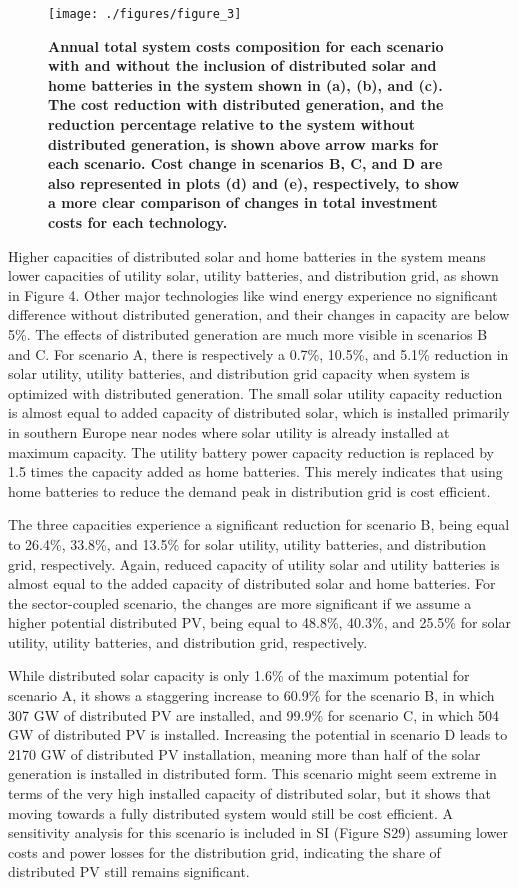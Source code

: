 \documentclass[review]{elsarticle}
\begin{document}
\begin{figure}
   \texttt{[image: ./figures/figure\_3]}
   \caption{\textbf{Annual total system costs composition for each scenario with and without the inclusion of distributed solar and home batteries in the system shown in (a), (b), and (c). The cost reduction with distributed generation, and the reduction percentage relative to the system without distributed generation, is shown above arrow marks for each scenario. Cost change in scenarios B, C, and D  are also represented in plots (d) and (e), respectively, to show a more clear comparison of changes in total investment costs for each technology.}}
   \label{fig:costs}
\end{figure}

Higher capacities of distributed solar and home batteries in the system means lower capacities of utility solar, utility batteries, and distribution grid, as shown in Figure 4. Other major technologies like wind energy experience no significant difference without distributed generation, and their changes in capacity are below 5\%. The effects of distributed generation are much more visible in scenarios B and C. For scenario A, there is respectively a 0.7\%, 10.5\%, and 5.1\% reduction in solar utility, utility batteries, and distribution grid capacity when system is optimized with distributed generation. The small solar utility capacity reduction is almost equal to added capacity of distributed solar, which is installed primarily in southern Europe near nodes where solar utility is already installed at maximum capacity. The utility battery power capacity reduction is replaced by 1.5 times the capacity added as home batteries. This merely indicates that using home batteries to reduce the demand peak in distribution grid is cost efficient.

The three capacities experience a significant reduction for scenario B, being equal to 26.4\%, 33.8\%, and 13.5\% for solar utility, utility batteries, and distribution grid, respectively. Again, reduced capacity of utility solar and utility batteries is almost equal to the added capacity of distributed solar and home batteries. For the sector-coupled scenario, the changes are more significant if we assume a higher potential distributed PV, being equal to 48.8\%, 40.3\%, and 25.5\% for solar utility, utility batteries, and distribution grid, respectively. 

While distributed solar capacity is only 1.6\% of the maximum potential for scenario A, it shows a staggering increase to 60.9\% for the scenario B, in which 307 GW of distributed PV are installed, and 99.9\% for scenario C, in which 504 GW of distributed PV is installed. Increasing the potential in scenario D leads to 2170 GW of distributed PV installation, meaning more than half of the solar generation is installed in distributed form. This scenario might seem extreme in terms of the very high installed capacity of distributed solar, but it shows that moving towards a fully distributed system would still be cost efficient. A sensitivity analysis for this scenario is included in SI (Figure S29) assuming lower costs and power losses for the distribution grid, indicating the share of distributed PV still remains significant.
\end{document}
